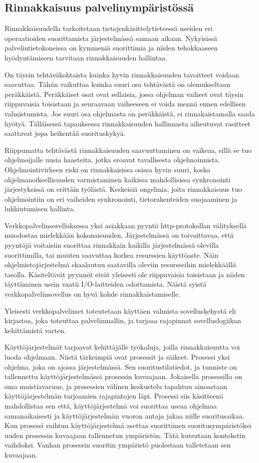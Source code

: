 \documentclass[12pt]{article}
\begin{document}
\subsection{Rinnakkaisuus palvelinympäristössä}

Rinnakkaisuudella tarkoitetaan tietojenkäsittelytieteessä useiden
eri operaatioiden suorittamista järjestelmässä samaan aikaan.
Nykyisissä palvelintietokoneissa on kymmeniä suorittimia ja niiden tehokkaaseen
hyödyntämiseen tarvitaan rinnakkaisuuden hallintaa.

On täysin tehtäväkohtaista
kuinka hyvin rinnakkaisuuden tavoitteet voidaan saavuttaa.
Tähän vaikuttaa kuinka suuri osa tehtävästä on olemukseltaan peräkkäistä.
Peräkkäiset osat ovat sellaisia, jossa ohjelman vaiheet ovat täysin
riippuvaisia toisistaan ja seuraavaan vaiheeseen ei voida mennä ennen edellisen
valmistumista. Jos suuri osa ohjelmasta on peräkkäistä, ei rinnakaistamalla
saada hyötyä. Tälläisessä tapauksessa rinnakkaisuuden hallinnasta aiheutuvat
rasitteet saattavat jopa heikentää suorituskykyä.

Riippumatta tehtävästä rinnakkaisuuden saavuuttaminen on vaikeaa,
sillä se tuo ohjelmoijalle uusia haasteita, jotka eroavat tavallisesta
ohjelmoinnista. Ohjelmointivirheen riski on rinnakkaisissa osissa hyvin suuri,
koska ohjelmanoikeellisuuden varmistaminen kaikissa mahdollisissa synkronointi
järjestyksissä on erittäin työlästä.
Keskeisiä ongelmia, joita rinnakkaisuus tuo ohjelmointiin on eri vaiheiden
synkronointi, tietorakenteiden suojaaminen ja lukkiutumisen hallinta.

Verkkopalvelinsovelluksessa yksi asiakkaan pyyntö http-protokollan välityksellä
muodostaa mielekkään kokonaisuuden.
Järjestelmässä on toivoittavaa, että pyyntöjä voitaisiin suorittaa
rinnakkain kaikilla järjestelmässä olevilla suorittimilla, tai muuten 
saavuttaa korkea resurssien käyttöaste.
Näin ohjelmistojärjestelmä skaalautuu saatavilla oleviin resursseihin
mielekkäällä tasolla. Käsiteltävät pyynnöt eivät yleisesti ole riippuvaisia
toisistaan ja niiden täyttäminen usein vaatii I/O-laitteiden odottamista.
Näistä syistä verkkopalvelinsovellus on hyvä kohde rinnakkaistamiselle.

Yleisesti verkkopalvelimet toteutetaan käyttäen valmista sovelluskehystä eli kirjastoa,
joka toteuttaa palvelinmallin, ja tarjoaa rajapinnat sovelluslogiikan
kehittämistä varten.

Käyttöjärjestelmät tarjoavat kehittäjälle työkaluja, joilla rinnakkaisuutta
voi luoda ohjelmaan. Niistä tärkeimpiä ovat prosessit ja säikeet.
Prosessi yksi ohjelma, joka on ajossa järjestelmässä. Sen suoritustilatiedot, ja tunniste on
tallennettu käyttöjärjestelmässä prosessin kuvaajaan. Jokaisella
prosessilla on oma muistiavaruus, ja prosessien välinen keskustelu
tapahtuu ainoastaan käyttöjärjestelmän tarjoamien rajapintojen läpi.
Prosessi siis käsitteenä mahdollistaa sen että, käyttöjärjestelmä
voi suorittaa useaa ohjelmaa samanaikaisesti ja käyttöjärjestelmän
vuoron antaja jakaa niille suoritusaikaa. Kun prosessi vaihtuu
käyttöjärjestelmä asettaa suorittimen suoritusympäristöksi
uuden prosessin kuvaajaan tallennetun ympäristön. Tätä kutsutaan kontekstin
vaihdoksi. Vanhan prosessin suoritin ympäristö puolestaan talletetaan sen 
kuvaajaan.
\end{document}
